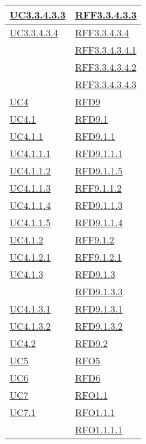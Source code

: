 \begin{longtable}{|>{\centering}m{5cm}|m{5cm}<{\centering}|}
\hyperref[UC3.3.4.3.3]{UC3.3.4.3.3} & \hyperlink{RFF3.3.4.3.3}{RFF3.3.4.3.3}\\ \hline
\hyperref[UC3.3.4.3.4]{UC3.3.4.3.4} & \hyperlink{RFF3.3.4.3.4}{RFF3.3.4.3.4}\\
& \hyperlink{RFF3.3.4.3.4.1}{RFF3.3.4.3.4.1}\\
& \hyperlink{RFF3.3.4.3.4.2}{RFF3.3.4.3.4.2}\\
& \hyperlink{RFF3.3.4.3.4.3}{RFF3.3.4.3.4.3}\\ \hline
\hyperref[UC4]{UC4} & \hyperlink{RFD9}{RFD9}\\ \hline
\hyperref[UC4.1]{UC4.1} & \hyperlink{RFD9.1}{RFD9.1}\\ \hline
\hyperref[UC4.1.1]{UC4.1.1} & \hyperlink{RFD9.1.1}{RFD9.1.1}\\ \hline
\hyperref[UC4.1.1.1]{UC4.1.1.1} & \hyperlink{RFD9.1.1.1}{RFD9.1.1.1}\\ \hline
\hyperref[UC4.1.1.2]{UC4.1.1.2} & \hyperlink{RFD9.1.1.5}{RFD9.1.1.5}\\ \hline
\hyperref[UC4.1.1.3]{UC4.1.1.3} & \hyperlink{RFF9.1.1.2}{RFF9.1.1.2}\\ \hline
\hyperref[UC4.1.1.4]{UC4.1.1.4} & \hyperlink{RFD9.1.1.3}{RFD9.1.1.3}\\ \hline
\hyperref[UC4.1.1.5]{UC4.1.1.5} & \hyperlink{RFD9.1.1.4}{RFD9.1.1.4}\\ \hline
\hyperref[UC4.1.2]{UC4.1.2} & \hyperlink{RFF9.1.2}{RFF9.1.2}\\ \hline
\hyperref[UC4.1.2.1]{UC4.1.2.1} & \hyperlink{RFF9.1.2.1}{RFF9.1.2.1}\\ \hline
\hyperref[UC4.1.3]{UC4.1.3} & \hyperlink{RFD9.1.3}{RFD9.1.3}\\
& \hyperlink{RFD9.1.3.3}{RFD9.1.3.3}\\ \hline
\hyperref[UC4.1.3.1]{UC4.1.3.1} & \hyperlink{RFD9.1.3.1}{RFD9.1.3.1}\\ \hline
\hyperref[UC4.1.3.2]{UC4.1.3.2} & \hyperlink{RFD9.1.3.2}{RFD9.1.3.2}\\ \hline
\hyperref[UC4.2]{UC4.2} & \hyperlink{RFD9.2}{RFD9.2}\\ \hline
\hyperref[UC5]{UC5} & \hyperlink{RFO5}{RFO5}\\ \hline
\hyperref[UC6]{UC6} & \hyperlink{RFD6}{RFD6}\\ \hline
\hyperref[UC7]{UC7} & \hyperlink{RFO1.1}{RFO1.1}\\ \hline
\hyperref[UC7.1]{UC7.1} & \hyperlink{RFO1.1.1}{RFO1.1.1}\\
& \hyperlink{RFO1.1.1.1}{RFO1.1.1.1}\\

\end{longtable}
